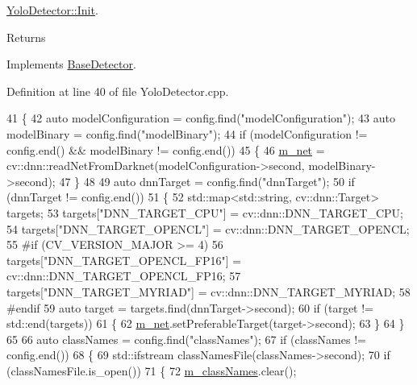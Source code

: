 \mbox{\hyperlink{class_yolo_detector_ac518bc6743145447f19c937c345689c0}{Yolo\+Detector\+::\+Init}}. 

\begin{DoxyReturn}{Returns}

\end{DoxyReturn}


Implements \mbox{\hyperlink{class_base_detector_a44c53608e9e4e3455ff553d987165260}{Base\+Detector}}.



Definition at line 40 of file Yolo\+Detector.\+cpp.


\begin{DoxyCode}
41 \{
42     \textcolor{keyword}{auto} modelConfiguration = config.find(\textcolor{stringliteral}{"modelConfiguration"});
43     \textcolor{keyword}{auto} modelBinary = config.find(\textcolor{stringliteral}{"modelBinary"});
44     \textcolor{keywordflow}{if} (modelConfiguration != config.end() && modelBinary != config.end())
45     \{
46         \mbox{\hyperlink{class_yolo_detector_ac5a1c603d2c9eaabf78549ca0125c1c7}{m\_net}} = cv::dnn::readNetFromDarknet(modelConfiguration->second, modelBinary->second);
47     \}
48 
49     \textcolor{keyword}{auto} dnnTarget = config.find(\textcolor{stringliteral}{"dnnTarget"});
50     \textcolor{keywordflow}{if} (dnnTarget != config.end())
51     \{
52         std::map<std::string, cv::dnn::Target> targets;
53         targets[\textcolor{stringliteral}{"DNN\_TARGET\_CPU"}] = cv::dnn::DNN\_TARGET\_CPU;
54         targets[\textcolor{stringliteral}{"DNN\_TARGET\_OPENCL"}] = cv::dnn::DNN\_TARGET\_OPENCL;
55 \textcolor{preprocessor}{#if (CV\_VERSION\_MAJOR >= 4)}
56         targets[\textcolor{stringliteral}{"DNN\_TARGET\_OPENCL\_FP16"}] = cv::dnn::DNN\_TARGET\_OPENCL\_FP16;
57         targets[\textcolor{stringliteral}{"DNN\_TARGET\_MYRIAD"}] = cv::dnn::DNN\_TARGET\_MYRIAD;
58 \textcolor{preprocessor}{#endif}
59         \textcolor{keyword}{auto} target = targets.find(dnnTarget->second);
60         \textcolor{keywordflow}{if} (target != std::end(targets))
61         \{
62             \mbox{\hyperlink{class_yolo_detector_ac5a1c603d2c9eaabf78549ca0125c1c7}{m\_net}}.setPreferableTarget(target->second);
63         \}
64     \}
65 
66     \textcolor{keyword}{auto} classNames = config.find(\textcolor{stringliteral}{"classNames"});
67     \textcolor{keywordflow}{if} (classNames != config.end())
68     \{
69         std::ifstream classNamesFile(classNames->second);
70         \textcolor{keywordflow}{if} (classNamesFile.is\_open())
71         \{
72             \mbox{\hyperlink{class_yolo_detector_aa0a06104a5778e9009ebfb0bbc6cecab}{m\_classNames}}.clear();

\end{DoxyCode}
